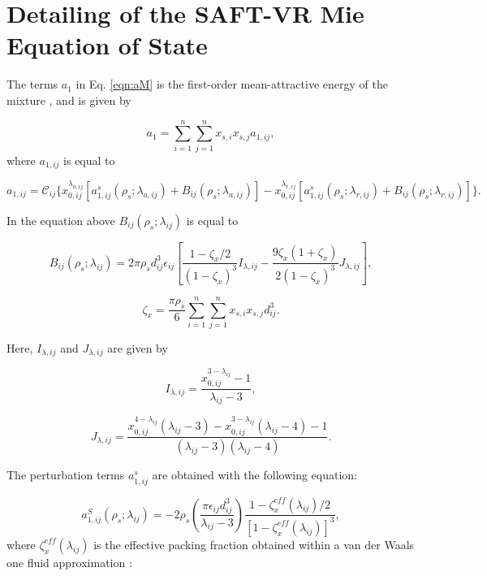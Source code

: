 
\chapter{Detailing of the SAFT-VR Mie Equation of State } \label{restodaseq}
The terms $a_{1}$  in Eq. \ref{eqn:aM} is the first-order mean-attractive energy of the mixture \cite{lafitte2013}, and is given by

\begin{equation}
a_{1} = \sum_{i=1}^{n} \sum_{j=1}^{n} x_{s,i} x_{s,j} a_{1,ij},
\end{equation}	
where $a_{1,ij}$ is equal to

\begin{equation}
a_{1,ij} = \mathcal{C}_{ij} \lbrace x_{0,ij}^{\lambda _{a,ij}} [a_{1,ij}^{s}(\rho _{s}; \lambda _{a,ij}) + B_{ij}(\rho _{s}; \lambda _{a,ij})] - x_{0,ij}^{\lambda _{r,ij}} [a_{1,ij}^{s}(\rho _{s}; \lambda _{r,ij}) + B_{ij}(\rho _{s}; \lambda _{r,ij})] \rbrace .
\end{equation}

In the equation above $B_{ij}(\rho _{s}; \lambda _{ij})$ is equal to

\begin{equation}
B_{ij}(\rho _{s}; \lambda _{ij}) =  2 \pi \rho _{s} d_{ij}^{3} \epsilon _{ij} \left[\dfrac{1 - \zeta _{x}/2}{(1-\zeta _{x})^3} I_{\lambda , ij} - \dfrac{9 \zeta _{x} (1 + \zeta _{x})}{2(1-\zeta _{x})^3} J_{\lambda , ij} \right],
\end{equation}

\begin{equation}
\zeta _{x} = \frac{\pi \rho _{s}}{6} \sum_{i=1}^{n} \sum_{j=1}^{n} x_{s,i} x_{s,j} d_{ij}^{3} .
\end{equation}

Here, $I_{\lambda , ij}$ and $J_{\lambda , ij}$ are given by

\begin{equation}
I_{\lambda , ij} = \dfrac{ x_{0,ij}^{3 - \lambda _{ij}} - 1}{\lambda _{ij} -3},
\end{equation}

\begin{equation}
J_{\lambda , ij} = \dfrac{ x_{0,ij}^{4 - \lambda _{ij}}(\lambda _{ij} -3) - x_{0,ij}^{3 - \lambda _{ij}}(\lambda _{ij} -4) -1}{(\lambda _{ij} -3)(\lambda _{ij} -4)}.
\end{equation}

The perturbation terms $a_{1,ij}^{s}$ are obtained with the following equation:

\begin{equation}
a_{1,ij}^{S} (\rho _{s} ; \lambda _{ij}) = -2 \rho _{s} \left(\dfrac{\pi \epsilon _{ij} d_{ij}^{3}}{\lambda _{ij} -3}\right) \dfrac{1 - \zeta _{x}^{eff}(\lambda _{ij})/2}{[1- \zeta _{x}^{eff}(\lambda _{ij})]^3},
\end{equation}
where $\zeta _{x}^{eff}(\lambda _{ij})$ is the effective packing fraction  obtained within a van der Waals one fluid approximation \cite{lafitte2013}:


